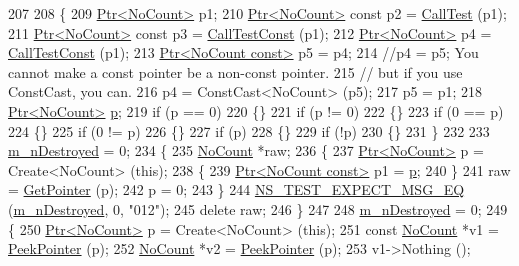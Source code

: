 \begin{DoxyCode}
207 
208   \{
209     \hyperlink{classns3_1_1Ptr}{Ptr<NoCount>} p1;
210     \hyperlink{classns3_1_1Ptr}{Ptr<NoCount>} \textcolor{keyword}{const} p2 = \hyperlink{classPtrTestCase_a5a8f1774dc4f729c4db20ce128fb3e66}{CallTest} (p1);
211     \hyperlink{classns3_1_1Ptr}{Ptr<NoCount>} \textcolor{keyword}{const} p3 = \hyperlink{classPtrTestCase_a8fb2196446c71e43fba045cf2a5f4ff7}{CallTestConst} (p1);
212     \hyperlink{classns3_1_1Ptr}{Ptr<NoCount>} p4 = \hyperlink{classPtrTestCase_a8fb2196446c71e43fba045cf2a5f4ff7}{CallTestConst} (p1);
213     \hyperlink{classns3_1_1Ptr}{Ptr<NoCount const>} p5 = p4;
214     \textcolor{comment}{//p4 = p5; You cannot make a const pointer be a non-const pointer.}
215     \textcolor{comment}{// but if you use ConstCast, you can.}
216     p4 = ConstCast<NoCount> (p5);
217     p5 = p1;
218     \hyperlink{classns3_1_1Ptr}{Ptr<NoCount>} \hyperlink{lte__link__budget_8m_ac9de518908a968428863f829398a4e62}{p};
219     \textcolor{keywordflow}{if} (p == 0)
220       \{\}
221     \textcolor{keywordflow}{if} (p != 0)
222       \{\}
223     \textcolor{keywordflow}{if} (0 == p)
224       \{\}
225     \textcolor{keywordflow}{if} (0 != p)
226       \{\}
227     \textcolor{keywordflow}{if} (p)
228       \{\}
229     \textcolor{keywordflow}{if} (!p)
230       \{\}
231   \}
232 
233   \hyperlink{classPtrTestCase_a189fef4a0d0e348de7554be35da17977}{m\_nDestroyed} = 0;
234   \{
235     \hyperlink{classNoCount}{NoCount} *raw;
236     \{
237       \hyperlink{classns3_1_1Ptr}{Ptr<NoCount>} p = Create<NoCount> (\textcolor{keyword}{this});
238       \{
239         \hyperlink{classns3_1_1Ptr}{Ptr<NoCount const>} p1 = \hyperlink{lte__link__budget_8m_ac9de518908a968428863f829398a4e62}{p};
240       \}
241       raw = \hyperlink{namespacens3_ab4e173cdfd43d17c1a40d5348510a670}{GetPointer} (p);
242       p = 0;
243     \}
244     \hyperlink{group__testing_ga7304ba46a28d8cf08dfdfd6499cf7068}{NS\_TEST\_EXPECT\_MSG\_EQ} (\hyperlink{classPtrTestCase_a189fef4a0d0e348de7554be35da17977}{m\_nDestroyed}, 0, \textcolor{stringliteral}{"012"});
245     \textcolor{keyword}{delete} raw;
246   \}
247 
248   \hyperlink{classPtrTestCase_a189fef4a0d0e348de7554be35da17977}{m\_nDestroyed} = 0;
249   \{
250     \hyperlink{classns3_1_1Ptr}{Ptr<NoCount>} p = Create<NoCount> (\textcolor{keyword}{this});
251     \textcolor{keyword}{const} \hyperlink{classNoCount}{NoCount} *v1 = \hyperlink{namespacens3_af2a7557fe9afdd98d8f6f8f6e412cf5a}{PeekPointer} (p);
252     \hyperlink{classNoCount}{NoCount} *v2 = \hyperlink{namespacens3_af2a7557fe9afdd98d8f6f8f6e412cf5a}{PeekPointer} (p);
253     v1->Nothing ();

\end{DoxyCode}
